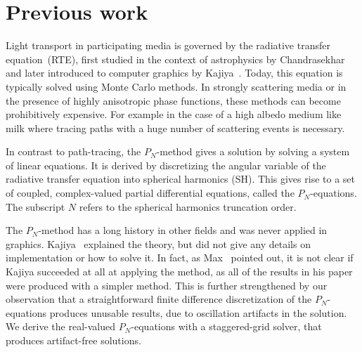 \section{Previous work}

Light transport in participating media is governed by the radiative transfer equation~(RTE), first studied in the context of astrophysics by Chandrasekhar~\cite{Chandrasekhar60} and later introduced to computer graphics by Kajiya~\cite{Kajiya86}. Today, this equation is typically solved using Monte Carlo methods. In strongly scattering media or in the presence of highly anisotropic phase functions, these methods can become prohibitively expensive. For example in the case of a high albedo medium like milk where tracing paths with a huge number of scattering events is necessary.


In contrast to path-tracing, the $P_N$-method gives a solution by solving a system of linear equations. It is derived by discretizing the angular variable of the radiative transfer equation into spherical harmonics (SH). This gives rise to a set of coupled, complex-valued partial differential equations, called the $P_N$-equations. The subscript $N$ refers to the spherical harmonics truncation order.

The $P_N$-method has a long history in other fields and was never applied in graphics. Kajiya~\cite{Kajiya84} explained the theory, but did not give any details on implementation or how to solve it. In fact, as Max~\cite{Max95} pointed out, it is not clear if Kajiya succeeded at all at applying the method, as all of the results in his paper were produced with a simpler method. This is further strengthened by our observation that a straightforward finite difference discretization of the $P_N$-equations produces unusable results, due to oscillation artifacts in the solution. We derive the real-valued $P_N$-equations with a staggered-grid solver, that produces artifact-free solutions.


